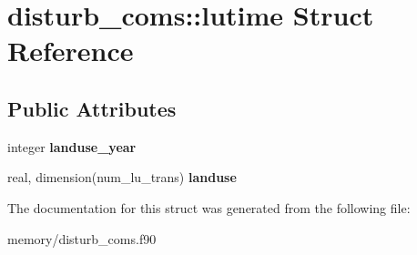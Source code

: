 \hypertarget{structdisturb__coms_1_1lutime}{
\section{disturb\_\-coms::lutime Struct Reference}
\label{structdisturb__coms_1_1lutime}
}
\subsection*{Public Attributes}
\begin{DoxyCompactItemize}
\item 
\hypertarget{structdisturb__coms_1_1lutime_afba2fbf3ca04baa3beedb424ebb51022}{
integer {\bfseries landuse\_\-year}}
\label{structdisturb__coms_1_1lutime_afba2fbf3ca04baa3beedb424ebb51022}

\item 
\hypertarget{structdisturb__coms_1_1lutime_a4e8bdfe0c9e37d7ac1e9673d7d261754}{
real, dimension(num\_\-lu\_\-trans) {\bfseries landuse}}
\label{structdisturb__coms_1_1lutime_a4e8bdfe0c9e37d7ac1e9673d7d261754}

\end{DoxyCompactItemize}


The documentation for this struct was generated from the following file:\begin{DoxyCompactItemize}
\item 
memory/disturb\_\-coms.f90\end{DoxyCompactItemize}
